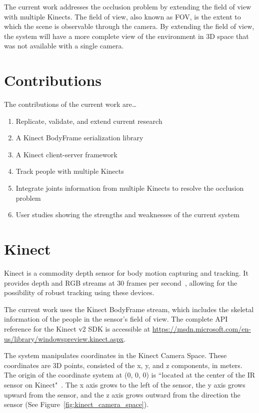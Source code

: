 The current work addresses the occlusion problem by extending the field of view with multiple Kinects. The field of view, also known as FOV, is the extent to which the scene is observable through the camera. By extending the field of view, the system will have a more complete view of the environment in 3D space that was not available with a single camera.

\section{Contributions}
\label{sec:introduction_contributions}

The contributions of the current work are\ldots

\begin{enumerate}
  \item Replicate, validate, and extend current research
  \item A Kinect BodyFrame serialization library
  \item A Kinect client-server framework
  \item Track people with multiple Kinects
  \item Integrate joints information from multiple Kinects to resolve the occlusion problem
  \item User studies showing the strengths and weaknesses of the current system
\end{enumerate}

\section{Kinect}
\label{sec:introduction_kinect}

Kinect is a commodity depth sensor for body motion capturing and tracking. It provides depth and RGB streams at 30 frames per second~\cite{microsoft_kinect_spec}, allowing for the possibility of robust tracking using these devices.

The current work uses the Kinect BodyFrame stream, which includes the skeletal information of the people in the sensor's field of view. The complete API reference for the Kinect v2 SDK is accessible at \url{https://msdn.microsoft.com/en-us/library/windowspreview.kinect.aspx}.

The system manipulates coordinates in the Kinect Camera Space. These coordinates are 3D points, consisted of the x, y, and z components, in meters. The origin of the coordinate system at (0, 0, 0) is ``located at the center of the IR sensor on Kinect"~\cite{microsoft_kinect_coordinates}. The x axis grows to the left of the sensor, the y axis grows upward from the sensor, and the z axis grows outward from the direction the sensor (See Figure~\ref{fig:kinect_camera_space}).

